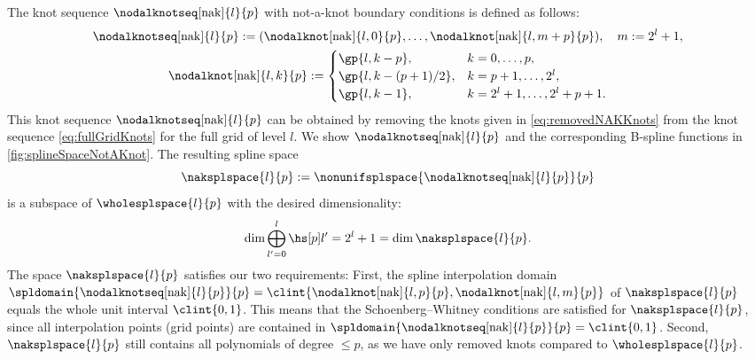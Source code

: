 The knot sequence $\nodalknotseq[\nak]{l}{p}$
with not-a-knot boundary conditions is defined as follows:
\begin{subequations}
  \begin{gather}
    \nodalknotseq[\nak]{l}{p}
    := (\nodalknot[\nak]{l,0}{p}, \dotsc,
    \nodalknot[\nak]{l,m+p}{p}),\quad
    m := 2^l + 1,\\
    \nodalknot[\nak]{l,k}{p}
    :=
    \begin{cases}
      \gp{l,k-p},&
      k = 0, \dotsc, p,\\
      \gp{l,k-(p+1)/2},&
      k = p + 1, \dotsc, 2^l,\\
      \gp{l,k-1},&
      k = 2^l + 1, \dotsc, 2^l + p + 1.
    \end{cases}
  \end{gather}
\end{subequations}
This knot sequence $\nodalknotseq[\nak]{l}{p}$
can be obtained by removing the knots
given in \eqref{eq:removedNAKKnots} from the
knot sequence \eqref{eq:fullGridKnots} for the full grid of level $l$.
We show $\nodalknotseq[\nak]{l}{p}$ and the corresponding B-spline functions
in \cref{fig:splineSpaceNotAKnot}.
The resulting spline space
\begin{equation}
  \naksplspace{l}{p}
  := \nonunifsplspace{\nodalknotseq[\nak]{l}{p}}{p}
\end{equation}
is a subspace
of $\wholesplspace{l}{p}$ with the desired dimensionality:
\begin{equation}
  \dim \bigoplus_{l'=0}^l \hsbspl{l'}{p}
  = 2^l + 1
  = \dim \naksplspace{l}{p}.
\end{equation}
The space $\naksplspace{l}{p}$ satisfies our two requirements:
\vspace{0.1em}%
First, the spline interpolation domain
$\spldomain{\nodalknotseq[\nak]{l}{p}}{p}
= \clint{\nodalknot[\nak]{l,p}{p}, \nodalknot[\nak]{l,m}{p}}$
of $\naksplspace{l}{p}$ equals the whole unit interval $\clint{0, 1}$.
\vspace{-0.3em}%
This means that the Schoenberg--Whitney conditions are satisfied
\vspace{0.1em}%
for $\naksplspace{l}{p}$, since all interpolation points
(grid points) are contained in
$\spldomain{\nodalknotseq[\nak]{l}{p}}{p} = \clint{0, 1}$.
\vspace{-0.3em}%
Second, $\naksplspace{l}{p}$ still contains all polynomials of
degree $\le p$, as we have only removed knots compared to
$\wholesplspace{l}{p}$.

